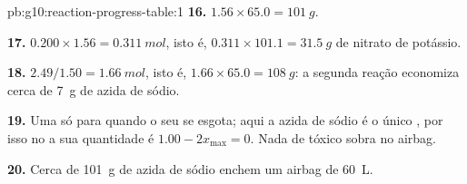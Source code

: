 \begin{solution}{pb:g10:reaction-progress-table:1}
\textbf{16.} $1.56 \times 65.0 = \qty{101}{g}$.

\textbf{17.} $0.200 \times 1.56 = \qty{0.311}{mol}$, isto é,
$0.311 \times 101.1 = \qty{31.5}{g}$ de nitrato de potássio.

\textbf{18.} $2.49 / 1.50 = \qty{1.66}{mol}$, isto é,
$1.66 \times 65.0 = \qty{108}{g}$: a segunda reação economiza cerca de
\qty{7}{g} de azida de sódio.

\textbf{19.} Uma  só para quando o seu 
se esgota; aqui a azida de sódio é o único , por isso no  a sua quantidade é $1.00 - 2x_{\max} = 0$. Nada de tóxico sobra
no airbag.

\textbf{20.} Cerca de \qty{101}{g} de azida de sódio enchem um airbag de
\qty{60}{L}.
\end{solution}
